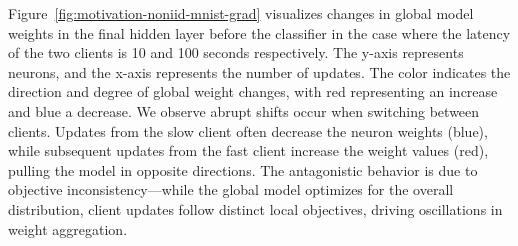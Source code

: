 Figure~\ref{fig:motivation-noniid-mnist-grad} visualizes changes in global model weights in the final hidden layer before the classifier in the case where the latency of the two clients is 10 and 100 seconds respectively.
The y-axis represents neurons, and the x-axis represents the number of updates.
The color indicates the direction and degree of global weight changes, with red representing an increase and blue a decrease. 
We observe abrupt shifts occur when switching between clients. Updates from the slow client often decrease the neuron weights (blue), while subsequent updates from the fast client increase the weight values (red), pulling the model in opposite directions. 
The antagonistic behavior is due to objective inconsistency---while the global model optimizes for the overall distribution, client updates follow distinct local objectives, driving oscillations in weight aggregation.